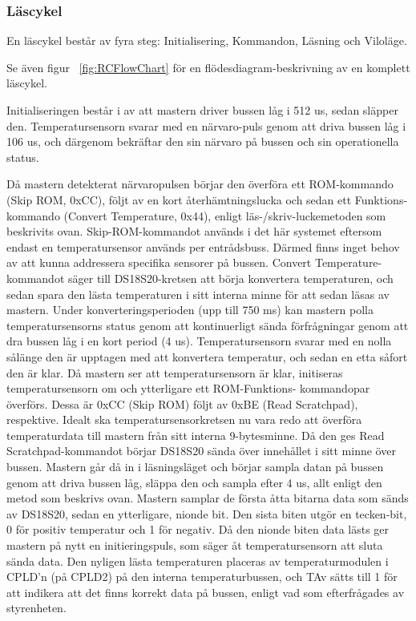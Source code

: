 \documentclass[a4paper,11pt]{article}
\begin{document}
	\subsubsection{Läscykel}

	En läscykel består av fyra steg: Initialisering, Kommandon, Läsning och Viloläge.

	Se även figur ~\ref{fig:RCFlowChart} för en flödesdiagram-beskrivning av en komplett läscykel.

	Initialiseringen består i av att mastern driver bussen låg i 512 us, sedan släpper den.
	Temperatursensorn svarar med en närvaro-puls genom att driva bussen låg i 106 us, och därgenom bekräftar den sin 	 närvaro på bussen och sin operationella status.

	Då mastern detekterat närvaropulsen börjar den överföra ett ROM-kommando (Skip ROM, 0xCC), följt av en kort 		återhämtningslucka och sedan ett Funktions-kommando (Convert Temperature, 0x44), enligt läs-/skriv-luckemetoden som 		beskrivits ovan.
	Skip-ROM-kommandot används i det här systemet eftersom endast en temperatursensor används per entrådsbuss.
	Därmed finns inget behov av att kunna addressera specifika sensorer på bussen.
	Convert Temperature-kommandot säger till DS18S20-kretsen att börja konvertera temperaturen, och sedan spara den 
	lästa temperaturen i sitt interna minne för att sedan läsas av mastern.
	Under konverteringsperioden (upp till 750 ms) kan mastern polla temperatursensorns status genom att kontinuerligt
	sända förfrågningar genom att dra bussen låg i en kort period (4 us). Temperatursensorn svarar med en nolla
	sålänge den är upptagen med att konvertera temperatur, och sedan en etta såfort den är klar.
	Då mastern ser att temperatursensorn är klar, initiseras temperatursensorn om och ytterligare ett ROM-Funktions- 		kommandopar överförs. Dessa är 0xCC (Skip ROM) följt av 0xBE (Read Scratchpad), respektive.
	Idealt ska temperatursensorkretsen nu vara redo att överföra temperaturdata till mastern från sitt interna 
	9-bytesminne.
	Då den ges Read Scratchpad-kommandot börjar DS18S20 sända över innehållet i sitt minne över bussen.
	Mastern går då in i läsningsläget och börjar sampla datan på bussen genom att driva bussen låg, släppa den och sampla efter 4 us,
	allt enligt den metod som beskrivs ovan. Mastern samplar de första åtta bitarna data som sänds av DS18S20, sedan en ytterligare,
	nionde bit. Den sista biten utgör en tecken-bit, 0 för positiv temperatur och 1 för negativ. Då den nionde biten data lästs
	ger mastern på nytt en initieringspuls, som säger åt temperatursensorn att sluta sända data.
	Den nyligen lästa temperaturen placeras av temperaturmodulen i CPLD'n (på CPLD2) på den interna temperaturbussen, och
	TAv sätts till 1 för att indikera att det finns korrekt data på bussen, enligt vad som efterfrågades av styrenheten.
\end{document}
